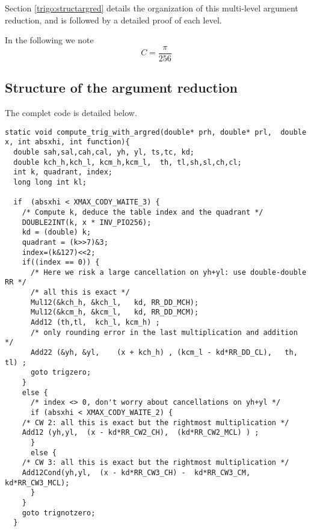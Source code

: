 Section \ref{trigo:structargred} details the organization of this
multi-level argument reduction, and is followed by a detailed proof of
each level.


In the following we note $$C=\frac{\pi}{256}$$


\subsection{Structure of the argument reduction
  \label{trigo:structargred}}
The complet code is detailed below.

\begin{lstlisting}[caption={Multilevel argument reduction},firstnumber=1]
static void compute_trig_with_argred(double* prh, double* prl,  double x, int absxhi, int function){ 
  double sah,sal,cah,cal, yh, yl, ts,tc, kd; 
  double kch_h,kch_l, kcm_h,kcm_l,  th, tl,sh,sl,ch,cl;
  int k, quadrant, index;
  long long int kl;

  if  (absxhi < XMAX_CODY_WAITE_3) {
    /* Compute k, deduce the table index and the quadrant */
    DOUBLE2INT(k, x * INV_PIO256);
    kd = (double) k;
    quadrant = (k>>7)&3;      
    index=(k&127)<<2;
    if((index == 0)) { 
      /* Here we risk a large cancellation on yh+yl: use double-double RR */
      /* all this is exact */
      Mul12(&kch_h, &kch_l,   kd, RR_DD_MCH);
      Mul12(&kcm_h, &kcm_l,   kd, RR_DD_MCM);
      Add12 (th,tl,  kch_l, kcm_h) ;
      /* only rounding error in the last multiplication and addition */ 
      Add22 (&yh, &yl,    (x + kch_h) , (kcm_l - kd*RR_DD_CL),   th, tl) ;
      goto trigzero;
    } 
    else {      
      /* index <> 0, don't worry about cancellations on yh+yl */
      if (absxhi < XMAX_CODY_WAITE_2) {
	/* CW 2: all this is exact but the rightmost multiplication */
	Add12 (yh,yl,  (x - kd*RR_CW2_CH),  (kd*RR_CW2_MCL) ) ; 
      }
      else { 
	/* CW 3: all this is exact but the rightmost multiplication */
	Add12Cond(yh,yl,  (x - kd*RR_CW3_CH) -  kd*RR_CW3_CM,   kd*RR_CW3_MCL);
      }
    }
    goto trignotzero;
  }


\end{lstlisting}
